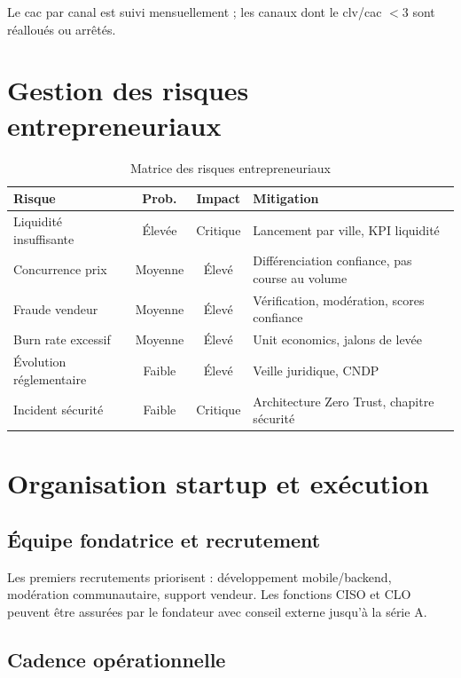 Le \gls{cac} par canal est suivi mensuellement ; les canaux dont le \gls{clv}/\gls{cac} $< 3$ sont réalloués ou arrêtés.

\section{Gestion des risques entrepreneuriaux}

\begin{table}[H]
  \centering
  \caption{Matrice des risques entrepreneuriaux}
  \label{tab:entrepreneur-risks}
  \small
  \begin{tabularx}{\textwidth}{@{}lccX@{}}
    \toprule
    \textbf{Risque} & \textbf{Prob.} & \textbf{Impact} & \textbf{Mitigation} \\
    \midrule
    Liquidité insuffisante & Élevée & Critique & Lancement par ville, KPI liquidité \\
    Concurrence prix & Moyenne & Élevé & Différenciation confiance, pas course au volume \\
    Fraude vendeur & Moyenne & Élevé & Vérification, modération, scores confiance \\
    Burn rate excessif & Moyenne & Élevé & Unit economics, jalons de levée \\
    Évolution réglementaire & Faible & Élevé & Veille juridique, CNDP \\
    Incident sécurité & Faible & Critique & Architecture Zero Trust, chapitre sécurité \\
    \bottomrule
  \end{tabularx}
\end{table}

\section{Organisation startup et exécution}

\subsection{Équipe fondatrice et recrutement}

Les premiers recrutements priorisent : développement mobile/backend, modération communautaire, support vendeur. Les fonctions CISO et CLO peuvent être assurées par le fondateur avec conseil externe jusqu'à la série A.

\subsection{Cadence opérationnelle}

